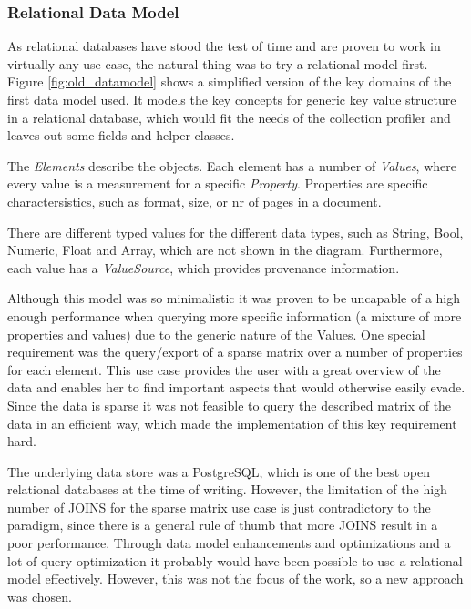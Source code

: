 \subsubsection{Relational Data Model}
As relational databases have stood the test of time and are proven to work in virtually any use case, the natural thing was to try a relational model first.
Figure \ref{fig:old_datamodel} shows a simplified version of the key domains of the first data model used. It models the key concepts for generic key value structure in a relational database, which would fit the needs of the collection profiler and leaves out some fields and helper classes. 

The \textit{Elements} describe the objects. Each element has a number of \textit{Values}, where every value is a measurement for a specific \textit{Property}. Properties are specific charactersistics, such as format, size, or nr of pages in a document. 

There are different typed values for the different data types, such as String, Bool, Numeric, Float and Array, which are not shown in the diagram. Furthermore, each value has a \textit{ValueSource}, which provides provenance information.

Although this model was so minimalistic it was proven to be uncapable of a high enough performance when querying more specific information (a mixture of more properties and values) due to the generic nature of the Values. One special requirement was the query/export of a sparse matrix over a number of properties for each element. This use case provides the user with a great overview of the data and enables her to find important aspects that would otherwise easily evade. Since the data is sparse it was not feasible to query the described matrix of the data in an efficient way, which made the implementation of this key requirement hard.

The underlying data store was a PostgreSQL, which is one of the best open relational databases at the time of writing. However, the limitation of the high number of JOINS for the sparse matrix use case is just contradictory to the paradigm, since there is a general rule of thumb that more JOINS result in a poor performance. Through data model enhancements and optimizations and a lot of query optimization it probably would have been possible to use a relational model effectively. However, this was not the focus of the work, so a new approach was chosen.


